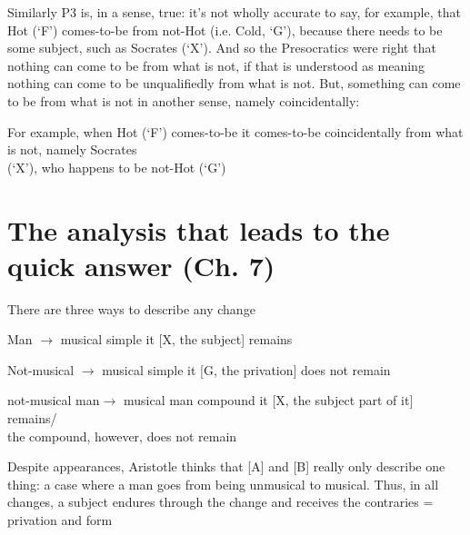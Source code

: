 \documentclass[11pt]{article}
\begin{document}
\noindent Similarly P3 is, in a sense, true: it's not wholly accurate to say, for example, that Hot (`F') comes-to-be from not-Hot (i.e. Cold, `G'), because there needs to be some subject, such as Socrates (`X'). And so the Presocratics were right that nothing can come to be from what is not, if that is understood as meaning nothing can come to be unqualifiedly from what is not. But, something can come to be from what is not in another sense, namely coincidentally:
\vspace*{1mm}

For example, when Hot (`F') comes-to-be it comes-to-be coincidentally from what is not, namely Socrates\\\hspace*{6mm}(`X'), who happens to be not-Hot (`G')
\vspace*{-3mm}

\section*{The analysis that leads to the quick answer (Ch. 7)}

\noindent There are three ways to describe any change
\vspace*{1mm}

\noindent[A] Man $\rightarrow$ musical\hspace*{30mm} simple\hspace*{30mm} it [X, the subject] remains
\vspace*{1mm}

\noindent[B] Not-musical $\rightarrow$ musical\hspace*{18mm} simple\hspace*{30.5mm} it [G, the privation] does not remain
\vspace*{1mm}

\noindent[C] not-musical man$\rightarrow$ musical man\hspace*{3.5mm} compound\hspace*{24.5mm} it [X, the subject part of it] remains/\\\hspace*{93mm} the compound, however, does not remain
\vspace*{2mm}

\noindent Despite appearances, Aristotle thinks that [A] and [B] really only describe one thing: a case where a man goes from being unmusical to musical. Thus, in all changes, a subject endures through the change and receives the contraries = privation and form
\vspace*{2mm}
\end{document}
